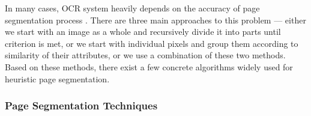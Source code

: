 In many cases, OCR system heavily depends on the accuracy of page segmentation process \citep{pageSegmentation}. There are three main approaches \citep{segmentationBenchmark} to this problem --- either we start with an image as a whole and recursively divide it into parts until criterion is met, or we start with individual pixels and group them according to similarity of their attributes, or we use a combination of these two methods. Based on these methods, there exist a few concrete algorithms widely used for heuristic page segmentation.

\subsubsection{Page Segmentation Techniques}


\clearpage

